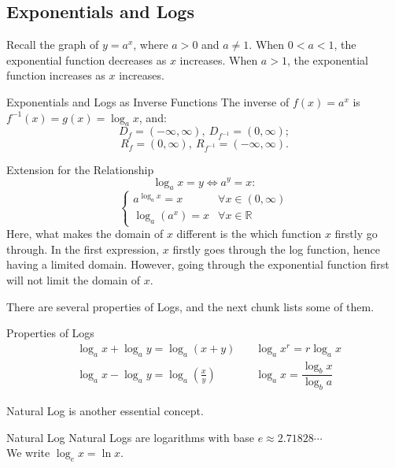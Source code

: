 \documentclass[12pt,a4paper]{article}
\def\R{{\mathbb{R}}}
\begin{document}
\subsection{Exponentials and Logs}
Recall the graph of $y=a^x$, where $a>0$ and $a\neq 1$. When $0<a<1$, the exponential function decreases as $x$ increases. When $a>1$, the exponential function increases as $x$ increases. 
\begin{thm}{Exponentials and Logs as Inverse Functions}
	The inverse of $f(x)=a^x$ is $f^{-1}(x)=g(x)=\log_a x$, and: 
	$$D_f=(-\infty,\infty),\ D_{f^{-1}}=(0,\infty);$$
	$$R_f=(0,\infty),\ R_{f^{-1}}=(-\infty,\infty).$$
\end{thm}
\begin{ext}{Extension for the Relationship}
	$$\log_a x=y \Longleftrightarrow a^y=x: $$
	$$\begin{cases}
		a^{\log_a x}=x &\forall x\in (0,\infty)\\
		\log_a (a^x)=x &\forall x\in\R
	\end{cases}$$
	Here, what makes the domain of $x$ different is the which function $x$ firstly go through. In the first expression, $x$ firstly goes through the log function, hence having a limited domain. However, going through the exponential function first will not limit the domain of $x$.
\end{ext}
There are several properties of Logs, and the next chunk lists some of them. 
\begin{thm}{Properties of Logs}
	$$\begin{aligned}
		&\log_ax+\log_ay=\log_a(x+y) \quad
		&\log_ax^r=r\log_ax \\
		&\log_ax-\log_ay=\log_a\left(\frac{x}{y}\right) \quad
		&\log_ax=\dfrac{\log_bx}{\log_ba}
	\end{aligned}$$
\end{thm}
Natural Log is another essential concept. 
\begin{df}{Natural Log}
	Natural Logs are logarithms with base $e\approx 2.71828\cdots$\\
	We write $\log_ex=\ln x$.
\end{df}
\end{document}
